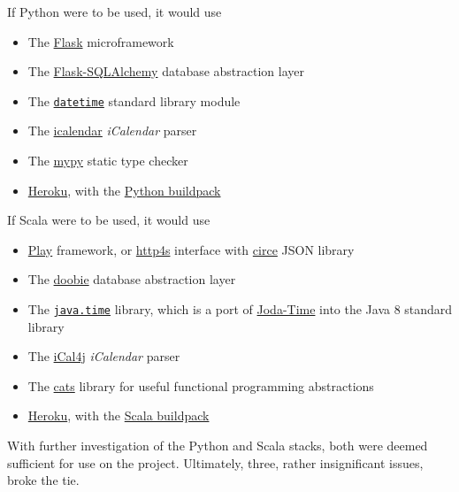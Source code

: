 \documentclass[11pt,a4paper]{report}
\begin{document}
If Python were to be used, it would use

\begin{itemize} 
    \item The \href{http://flask.pocoo.org/}{Flask} microframework
    \item The \href{http://flask-sqlalchemy.pocoo.org/2.1/}{Flask-SQLAlchemy} database abstraction layer
    \item The \href{https://docs.python.org/3/library/datetime.html}{\texttt{datetime}} standard library module
    \item The \href{https://pypi.python.org/pypi/icalendar}{icalendar} \textit{iCalendar} parser
    \item The \href{http://mypy-lang.org/}{mypy} static type checker
    \item \href{https://www.heroku.com/}{Heroku}, with the \href{https://github.com/heroku/heroku-buildpack-python}{Python buildpack}
\end{itemize}


If Scala were to be used, it would use

\begin{itemize}
    \item \href{https://www.playframework.com/}{Play} framework, or \href{https://github.com/http4s/http4s}{http4s} interface with \href{https://github.com/circe/circe}{circe} JSON library
    \item The \href{https://github.com/tpolecat/doobie}{doobie} database abstraction layer
    \item The \href{https://docs.oracle.com/javase/8/docs/api/java/time/package-summary.html}{\texttt{java.time}} library, which is a port of \href{http://www.joda.org/joda-time/}{Joda-Time} into the Java 8 standard library
    \item The \href{https://github.com/ical4j/ical4j}{iCal4j} \textit{iCalendar} parser
    \item The \href{https://github.com/typelevel/cats}{cats} library for useful functional programming abstractions
    \item \href{https://www.heroku.com/}{Heroku}, with the \href{https://github.com/heroku/heroku-buildpack-scala}{Scala buildpack}
\end{itemize}


With further investigation of the Python and Scala stacks, both were deemed sufficient for use on the project. Ultimately, three, rather insignificant issues, broke the tie.
\end{document}
